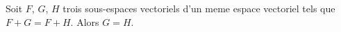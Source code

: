 Soit $F$, $G$, $H$ trois sous-espaces vectoriels d'un meme espace vectoriel tels que $F + G = F + H$. Alors $G = H$.

\begin{reponses}
\end{reponses}

